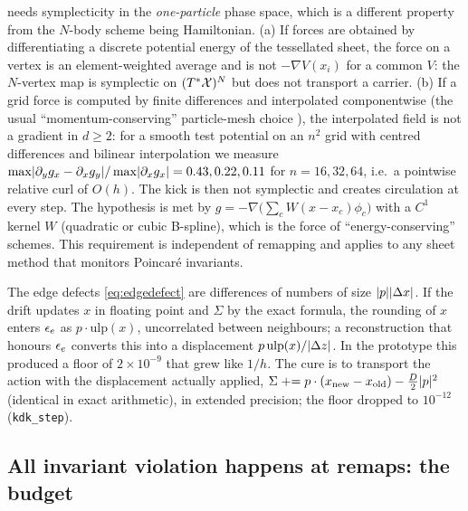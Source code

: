 \begin{remark}\label{rem:force}
 needs symplecticity in the \emph{one-particle} phase space, which is a different property from
the $N$-body scheme being Hamiltonian. (a) If forces are obtained by differentiating a discrete potential energy
of the tessellated sheet, the force on a vertex is an element-weighted average and is not $-\nabla V(x_i)$ for a
common $V$: the $N$-vertex map is symplectic on $(T^*\mathcal{X})^N$ but does not transport a carrier. (b) If a grid force is
computed by finite differences and interpolated componentwise (the usual ``momentum-conserving'' particle-mesh
choice \cite{HockneyEastwood}), the interpolated field is not a gradient in $d\ge2$: for a smooth test potential on an
$n^2$ grid with centred differences and bilinear interpolation we measure
$\max\lvert \partial_yg_x-\partial_xg_y\rvert/\max\lvert \partial_xg_x\rvert=0.43, 0.22, 0.11$ for $n=16,32,64$, i.e.\ a pointwise
relative curl of $O(h)$. The kick is then not symplectic and creates circulation at every step. The hypothesis is
met by $g=-\nabla\big(\sum_cW(x-x_c)\phi_c\big)$ with a $C^1$ kernel $W$ (quadratic or cubic B-spline), which is
the force of ``energy-conserving'' schemes. This requirement is independent of remapping and applies to any
sheet method that monitors Poincar\'e invariants.
\end{remark}

\begin{remark}\label{rem:roundoff}
The edge defects \eqref{eq:edgedefect} are differences of numbers of size $\lvert p\rvert\lvert \Delta x\rvert$. If the drift
updates $x$ in floating point and $\Sigma$ by the exact formula, the rounding of $x$ enters $\epsilon_e$ as
$p\cdot\mathrm{ulp}(x)$, uncorrelated between neighbours; a reconstruction that honours $\epsilon_e$ converts this into a
displacement $p\,\mathrm{ulp}(x)/\lvert \Delta z\rvert$. In the prototype this produced a floor of $2\times10^{-9}$ that grew
like $1/h$. The cure is to transport the action with the displacement actually applied,
$\Sigma\mathrel{+}=p\cdot(x_{\rm new}-x_{\rm old})-\tfrac D2\lvert p\rvert^2$ (identical in exact arithmetic), in extended
precision; the floor dropped to $10^{-12}$ (\texttt{kdk\_step}).
\end{remark}

\subsection{All invariant violation happens at remaps: the budget}

